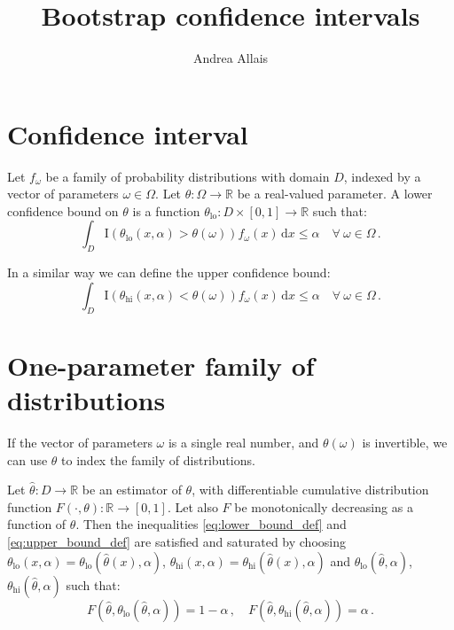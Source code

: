 \documentclass{article}
\author{Andrea Allais}
\title{Bootstrap confidence intervals}
\newcommand{\dd}{\mathrm{d}}
\newcommand{\indicator}[1]{\mathrm{I}\left(#1\right)}
\begin{document}
\maketitle
\section{Confidence interval}
Let $f_\omega$ be a family of probability distributions with domain $D$,
indexed by a vector of parameters $\omega \in \Omega$. Let $\theta: \Omega \to
\mathbb{R}$ be a real-valued parameter. A lower confidence bound on $\theta$ is
a function $\theta_{\mathrm{lo}} : D \times [0, 1] \to \mathbb{R}$ such that:
\begin{equation} \label{eq:lower_bound_def}
\int_{D} \indicator{\theta_{\mathrm{lo}}(x, \alpha) > \theta(\omega)} 
f_\omega(x)\, \dd x \le \alpha \quad \forall\ \omega \in \Omega\,.
\end{equation}

In a similar way we can define the upper confidence bound:
\begin{equation} \label{eq:upper_bound_def}
\int_{D} \indicator{\theta_{\mathrm{hi}}(x, \alpha) < \theta(\omega)} 
f_\omega(x)\, \dd x \le \alpha \quad \forall\ \omega \in \Omega\,.
\end{equation}

\section{One-parameter family of distributions}
If the vector of parameters $\omega$ is a single real number, and
$\theta(\omega)$ is invertible, we can use $\theta$ to index the family of
distributions.

Let $\hat{\theta}: D \to \mathbb{R}$ be an estimator of $\theta$, with
differentiable cumulative distribution function $F(\cdot, \theta):\mathbb{R}
\to [0,1]$. Let also $F$ be monotonically decreasing as a function of $\theta$.
Then the inequalities \eqref{eq:lower_bound_def} and \eqref{eq:upper_bound_def}
are satisfied and saturated by choosing $\theta_{\mathrm{lo}}(x, \alpha) =
\theta_{\mathrm{lo}}(\hat{\theta}(x), \alpha)$, $\theta_{\mathrm{hi}}(x,
\alpha) = \theta_{\mathrm{hi}}(\hat{\theta}(x), \alpha)$ and
$\theta_{\mathrm{lo}}(\hat{\theta}, \alpha)$,
$\theta_{\mathrm{hi}}(\hat{\theta}, \alpha)$ such that:
\begin{equation}
F\left(\hat{\theta}, \theta_\mathrm{lo}(\hat\theta, \alpha)\right) = 
  1-\alpha\,, \quad
F\left(\hat{\theta}, \theta_\mathrm{hi}(\hat\theta, \alpha)\right) = \alpha\,.
\end{equation}
\end{document}
